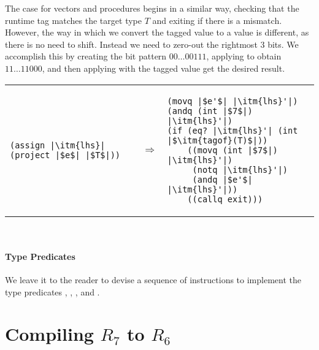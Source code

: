 \documentclass[11pt]{book}
\newcommand{\tagbits}{3} %
\newcommand{\tagmask}{7} %
\begin{document}
The case for vectors and procedures begins in a similar way, checking
that the runtime tag matches the target type $T$ and exiting if there
is a mismatch. However, the way in which we convert the tagged value
to a value is different, as there is no need to shift. Instead we need
to zero-out the rightmost $\tagbits$ bits. We accomplish this by creating the
bit pattern $00{\ldots}00111$, applying  to obtain
$11{\ldots}11000$, and then applying  with the tagged value get the
desired result. \\
%
\begin{tabular}{lll}
\begin{minipage}{0.4\textwidth}
\begin{lstlisting}
(assign |\itm{lhs}| (project |$e$| |$T$|))
\end{lstlisting}
\end{minipage}
&
$\Rightarrow$
&
\begin{minipage}{0.5\textwidth}
\begin{lstlisting}
(movq |$e'$| |\itm{lhs}'|)
(andq (int |$\tagmask$|) |\itm{lhs}'|)
(if (eq? |\itm{lhs}'| (int |$\itm{tagof}(T)$|))
    ((movq (int |$\tagmask$|) |\itm{lhs}'|)
     (notq |\itm{lhs}'|)
     (andq |$e'$| |\itm{lhs}'|))
    ((callq exit)))
\end{lstlisting}
\end{minipage}
\end{tabular}  \\

\paragraph{Type Predicates} We leave it to the reader to
devise a sequence of instructions to implement the type predicates
, , , and .

\section{Compiling $R_7$ to $R_6$}
\label{sec:compile-r7}
\end{document}
